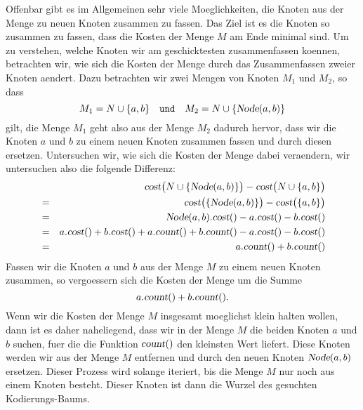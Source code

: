 Offenbar gibt es im Allgemeinen sehr viele Moeglichkeiten, die Knoten aus der Menge zu
neuen Knoten zusammen zu fassen.  Das Ziel ist es die Knoten so zusammen zu fassen, dass
die Kosten der Menge $M$ am Ende  minimal sind.
Um zu verstehen, welche Knoten wir am geschicktesten zusammenfassen koennen, betrachten wir, wie
sich die Kosten der Menge durch das Zusammenfassen zweier Knoten aendert.
Dazu betrachten wir zwei Mengen von Knoten $M_1$ und $M_2$, so dass 
\[ M_1 = N \cup \{ a, b\} \quad \mathtt{und} \quad M_2 = N \cup \{ \textsl{Node}(a,b) \} \]
gilt, die Menge $M_1$ geht also aus der Menge $M_2$ dadurch hervor, dass wir
die Knoten $a$ und $b$ zu einem neuen Knoten zusammen fassen und durch diesen ersetzen.
Untersuchen wir, wie
sich die Kosten der Menge dabei veraendern, wir untersuchen also die folgende Differenz:
\begin{eqnarray*}
& & \textsl{cost}\bigl(N \cup \{ \textsl{Node}(a,b) \}\bigr) - \textsl{cost}\bigl(N \cup \{ a,b \}\bigr) \\
&=& \textsl{cost}\bigl( \{ \textsl{Node}(a,b) \}\bigr) - \textsl{cost}\bigl(\{ a,b \}\bigr)              \\
&=& \textsl{Node}(a,b).\textsl{cost}() - a.\textsl{cost}() - b.\textsl{cost}()                           \\
&=&   a.\textsl{cost}() + b.\textsl{cost}() + a.\textsl{count}() + b.\textsl{count}() 
    - a.\textsl{cost}() - b.\textsl{cost}()                                                              \\
&=& a.\textsl{count}() + b.\textsl{count}() 
\end{eqnarray*}
Fassen wir die Knoten $a$ und $b$ aus der Menge $M$ zu einem neuen Knoten zusammen, so vergoessern sich
die Kosten der Menge um die Summe
\[ a.\textsl{count}() + b.\textsl{count}(). \]
Wenn wir die Kosten der Menge $M$ insgesamt moeglichst klein halten wollen, dann ist es daher naheliegend,
dass wir in der Menge $M$ die beiden Knoten $a$ und $b$ suchen, fuer die die Funktion
$\textsl{count}()$ den kleinsten Wert liefert.  Diese Knoten werden wir aus der Menge $M$
entfernen und durch den neuen Knoten $\textsl{Node}(a,b)$ ersetzen.
Dieser Prozess wird solange iteriert, bis die Menge $M$ nur noch aus einem Knoten besteht.  Dieser
Knoten ist dann die Wurzel des gesuchten Kodierungs-Baums. 

